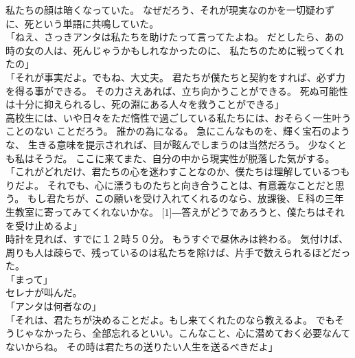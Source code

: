 \documentclass[../IHMain]{subfiles}
\begin{document}
私たちの顔は暗くなっていた。
なぜだろう、それが現実なのかを一切疑わずに、死という単語に共鳴していた。\\
「ねえ、さっきアンタは私たちを助けたって言ってたよね。
だとしたら、あの時の女の人は、死んじゃうかもしれなかったのに、
私たちのために戦ってくれたの」\\
「それが事実だよ。でもね、大丈夫。
君たちが僕たちと契約をすれば、必ず力を得る事ができる。
その力さえあれば、立ち向かうことができる。
死ぬ可能性は十分に抑えられるし、死の淵にある人々を救うことができる」\\
高校生には、いや日々をただ惰性で過ごしている私たちには、おそらく一生叶うことのない
ことだろう。
誰かの為になる。
急にこんなものを、輝く宝石のような、
生きる意味を提示されれば、目が眩んでしまうのは当然だろう。
少なくとも私はそうだ。
ここに来てまた、自分の中から現実性が脱落した気がする。\\
「これがどれだけ、君たちの心を迷わすことなのか、僕たちは理解しているつもりだよ。
それでも、心に漂うものたちと向き合うことは、有意義なことだと思う。
もし君たちが、この願いを受け入れてくれるのなら、放課後、Ｅ科の三年生教室に寄ってみてくれないかな。
\scalebox{3}[1]{―}答えがどうであろうと、僕たちはそれを受け止めるよ」\\
時計を見れば、すでに１２時５０分。
もうすぐで昼休みは終わる。
気付けば、周りも人は疎らで、残っているのは私たちを除けば、片手で数えられるほどだった。\\
「まって」\\
セレナが叫んだ。\\
「アンタは何者なの」\\
「それは、君たちが決めることだよ。もし来てくれたのなら教えるよ。
でもそうじゃなかったら、全部忘れるといい。こんなこと、心に潜めておく必要なんてないからね。
その時は君たちの送りたい人生を送るべきだよ」\\
\end{document}
